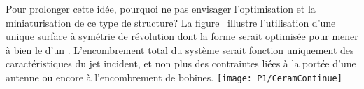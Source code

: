 Pour prolonger cette idée, pourquoi ne pas envisager l'optimisation et la miniaturisation de ce type de structure? 
La figure~ illustre l'utilisation d'une unique surface à symétrie de révolution dont la forme serait optimisée pour mener à bien le \rpef d'un \jatmg. L'encombrement total du système serait fonction uniquement des caractéristiques du jet incident, et non plus des contraintes liées à la portée d'une antenne \rf ou encore à l'encombrement de bobines. 
\bfighs
\texttt{[image: P1/CeramContinue]}
\label{fig:CeramContinue}
\efigh



